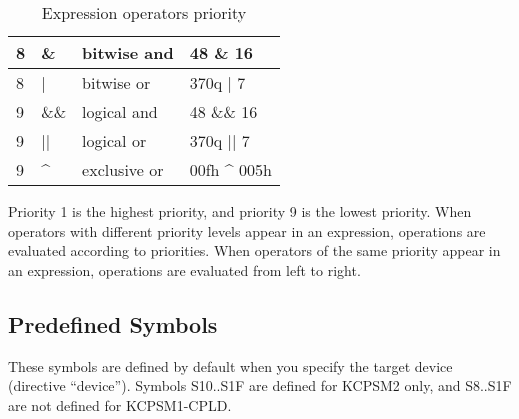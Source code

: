 \begin{table}[h!]
\begin{tabular}{|l|l|l|l|}
                8        & \&       & bitwise and             & 48 \& 16        \\\hline
                8        & |        & bitwise or              & 370q | 7        \\\hline
                9        & \&\&     & logical and             & 48 \&\& 16      \\\hline
                9        & ||       & logical or              & 370q || 7       \\\hline
                9        & \^{}     & exclusive or            & 00fh \^{} 005h  \\\hline
            \end{tabular}

            \caption{Expression operators priority}
        \end{table}

        Priority 1 is the highest priority, and priority 9 is the lowest priority. When operators with different priority levels appear in an expression, operations are evaluated according to priorities. When operators of the same priority appear in an expression, operations are evaluated from left to right.

    \subsection{Predefined Symbols}
        These symbols are defined by default when you specify the target device (directive ``device''). Symbols S10..S1F are defined for KCPSM2 only, and S8..S1F are not defined for KCPSM1-CPLD.

